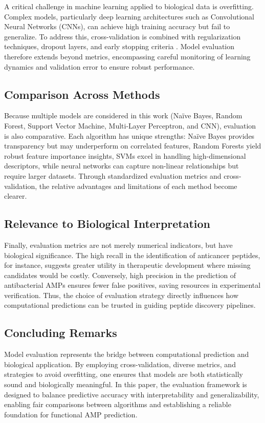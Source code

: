 \documentclass[a4paper,twoside,12pt]{book}
\begin{document}
A critical challenge in machine learning applied to biological data is overfitting. Complex models, particularly deep learning architectures such as Convolutional Neural Networks (CNNs), can achieve high training accuracy but fail to generalize. To address this, cross-validation is combined with regularization techniques, dropout layers, and early stopping criteria \cite{bib:goodfellow2016}. Model evaluation therefore extends beyond metrics, encompassing careful monitoring of learning dynamics and validation error to ensure robust performance.

\subsection{Comparison Across Methods}

Because multiple models are considered in this work (Naïve Bayes, Random Forest, Support Vector Machine, Multi-Layer Perceptron, and CNN), evaluation is also comparative. Each algorithm has unique strengths: Naïve Bayes provides transparency but may underperform on correlated features, Random Forests yield robust feature importance insights, SVMs excel in handling high-dimensional descriptors, while neural networks can capture non-linear relationships but require larger datasets. Through standardized evaluation metrics and cross-validation, the relative advantages and limitations of each method become clearer.

\subsection{Relevance to Biological Interpretation}

Finally, evaluation metrics are not merely numerical indicators, but have biological significance. The high recall in the identification of anticancer peptides, for instance, suggests greater utility in therapeutic development where missing candidates would be costly. Conversely, high precision in the prediction of antibacterial AMPs ensures fewer false positives, saving resources in experimental verification. Thus, the choice of evaluation strategy directly influences how computational predictions can be trusted in guiding peptide discovery pipelines.

\subsection{Concluding Remarks}

Model evaluation represents the bridge between computational prediction and biological application. By employing cross-validation, diverse metrics, and strategies to avoid overfitting, one ensures that models are both statistically sound and biologically meaningful. In this paper, the evaluation framework is designed to balance predictive accuracy with interpretability and generalizability, enabling fair comparisons between algorithms and establishing a reliable foundation for functional AMP prediction.
\end{document}
